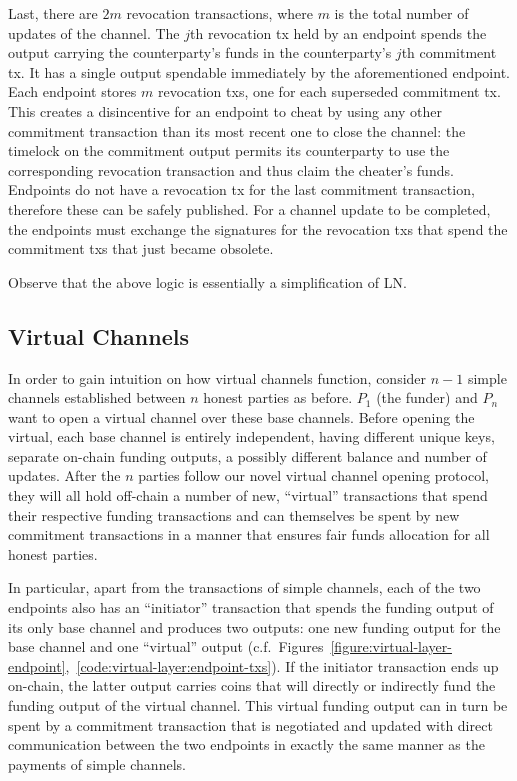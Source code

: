   Last, there are $2m$ revocation transactions, where $m$ is the total number of
  updates of the channel. The $j$th revocation tx held by an endpoint spends the
  output carrying the counterparty's funds in the counterparty's $j$th
  commitment tx. It has a single output spendable immediately by the
  aforementioned endpoint. Each endpoint stores $m$ revocation txs, one for each
  superseded commitment tx. This creates a disincentive for an endpoint to cheat
  by using any other commitment transaction than its most recent one to close
  the channel: the timelock on the commitment output permits its counterparty to
  use the corresponding revocation transaction and thus claim the cheater's
  funds.  Endpoints do not have a revocation tx for the last commitment
  transaction, therefore these can be safely published. For a channel update to
  be completed, the endpoints must exchange the signatures for the revocation
  txs that spend the commitment txs that just became obsolete.

  Observe that the above logic is essentially a simplification of LN.

\subsection{Virtual Channels}
  In order to gain intuition on how virtual channels function, consider $n-1$
  simple channels established between $n$ honest parties as before. $P_1$ (the
  funder) and $P_n$ want to open a virtual channel over these base channels.
  Before opening the virtual, each base channel is entirely independent, having
  different unique keys, separate on-chain funding outputs, a possibly different
  balance and number of updates. After the $n$ parties follow our novel virtual
  channel opening protocol, they will all hold off-chain a number of new,
  ``virtual'' transactions that spend their respective funding transactions and
  can themselves be spent by new commitment transactions in a manner that
  ensures fair funds allocation for all honest parties.

  In particular, apart from the transactions of simple channels, each of the two
  endpoints also has an ``initiator'' transaction that spends the funding output
  of its only base channel and produces two outputs: one new funding output for
  the base channel and one ``virtual'' output (c.f.\
  Figures~\ref{figure:virtual-layer-endpoint},~\ref{code:virtual-layer:endpoint-txs}).
  If the
  initiator 
  transaction ends up on-chain, the latter output carries coins that
  will directly or indirectly fund the funding output of the virtual channel.
  This virtual funding output can in turn be spent by a commitment transaction
  that is negotiated and updated with direct communication between the two
  endpoints in exactly the same manner as the payments of simple channels.

